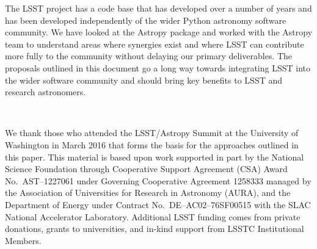 \documentclass[]{spie}  %
\begin{document}
The LSST project has a code base that has developed over a number of years and has been developed independently of the wider Python astronomy software community.
We have looked at the Astropy package and worked with the Astropy team to understand areas where synergies exist and where LSST can contribute more fully to the community without delaying our primary deliverables.
The proposals outlined in this document go a long way towards integrating LSST into the wider software community and should bring key benefits to LSST and research astronomers.

\acknowledgments\

We thank those who attended the LSST/Astropy Summit at the University of Washington in March 2016 that forms the basis for the approaches outlined in this paper.
This material is based upon work supported in part by the National Science Foundation through Cooperative Support Agreement (CSA) Award No.\ AST--1227061 under Governing Cooperative Agreement 1258333 managed by the Association of Universities for Research in Astronomy (AURA), and the Department of Energy under Contract No.\ DE--AC02--76SF00515 with the SLAC National Accelerator Laboratory.
Additional LSST funding comes from private donations, grants to universities, and in-kind support from LSSTC Institutional Members.

\end{document}
